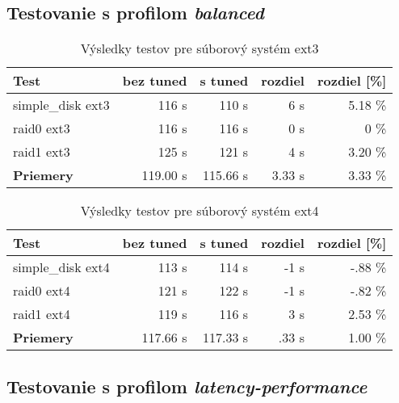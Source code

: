%
%
\subsection{Testovanie s profilom \emph{balanced}}

\begin{table}[H]
\begin{center}
\begin{tabular}{|l|r|r|r|r|}
    \hline
    \textbf{Test} & \textbf{bez tuned} & \textbf{s tuned} & \textbf{rozdiel} & \textbf{rozdiel [\%]} \\ \hline
    simple\_disk ext3 & 116 s & 110 s & 6 s & 5.18 \% \\
    \hline
    raid0 ext3 & 116 s & 116 s & 0 s & 0 \% \\
    \hline
    raid1 ext3 & 125 s & 121 s & 4 s & 3.20 \% \\
    \hline
    \textbf{Priemery} & 119.00 s & 115.66 s & 3.33 s & 3.33 \% \\
    \hline
\end{tabular}
\caption{Výsledky testov pre súborový systém ext3}
\label{tab:results-ext3}
\end{center}
\end{table}

\begin{table}[H]
\begin{center}
\begin{tabular}{|l|r|r|r|r|}
    \hline
    \textbf{Test} & \textbf{bez tuned} & \textbf{s tuned} & \textbf{rozdiel} & \textbf{rozdiel [\%]} \\ \hline
    simple\_disk ext4 & 113 s & 114 s & -1 s & -.88 \% \\
    \hline
    raid0 ext4 & 121 s & 122 s & -1 s & -.82 \% \\
    \hline
    raid1 ext4 & 119 s & 116 s & 3 s & 2.53 \% \\
    \hline
    \textbf{Priemery} & 117.66 s & 117.33 s & .33 s & 1.00 \% \\
    \hline
\end{tabular}
\caption{Výsledky testov pre súborový systém ext4}
\label{tab:results-ext4}
\end{center}
\end{table}

\subsection{Testovanie s profilom \emph{latency-performance}}

